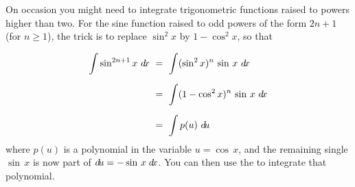 \divider
\newpage
On occasion you might need to integrate trigonometric functions raised to powers
higher than two. For the sine function raised to odd powers of the form $2n+1$
(for $n \ge 1$), the trick is to replace $\sin^2 x$ by $1 - \cos^2 x$, so that

\begin{align*}
\int \sin^{2n+1} x~d\!x ~&=~ \int (\sin^2 x)^n \,\sin\,x~d\!x\\[6pt]
&=~ \int (1 - \cos^2 x)^n \,\sin\,x~d\!x\\[6pt]
&=~ \int p(u)~d\!u
\end{align*}
where $p(u)$ is a polynomial in the variable $u=\cos\,x$, and the remaining
single $\sin\,x$ is now part of $d\!u = -\sin\,x\;d\!x$. You can then use the
 to integrate that polynomial.

